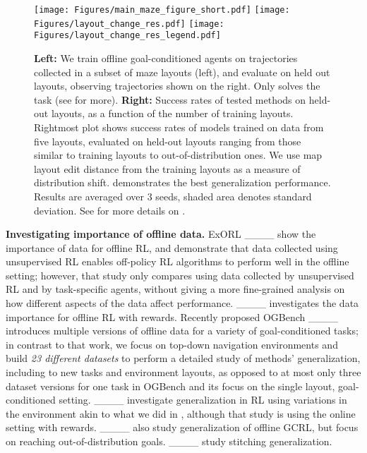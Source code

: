 \begin{figure}[t]
    \centering
    \texttt{[image: Figures/main\_maze\_figure\_short.pdf]}
    \texttt{[image: Figures/layout\_change\_res.pdf]}
    \texttt{[image: Figures/layout\_change\_res\_legend.pdf]}
    \caption{\textbf{Left:} We train offline goal-conditioned agents on trajectories collected in a subset of maze layouts (left), and evaluate on held out layouts, observing trajectories shown on the right. Only \JEPA{} solves the task (see  for more). \textbf{Right:} Success rates of tested methods on held-out layouts, as a function of the number of training layouts. Rightmost plot shows success rates of models trained on data from five layouts,
    evaluated on held-out layouts ranging from those similar to training layouts to out-of-distribution ones. We use map layout edit distance from the training layouts as a measure of distribution shift. \JEPA{} demonstrates the best generalization performance. Results are averaged over 3 seeds, shaded area denotes standard deviation. See  for more details on \JEPA{}.}
    \label{fig:maze_main_figure}
\end{figure}

\pagebreak

\textbf{Investigating importance of offline data.} ExORL ____ show the importance of data for offline RL, and demonstrate that data collected using unsupervised RL enables off-policy RL algorithms to perform well in the offline setting; however, that study only compares using data collected by unsupervised RL and by task-specific agents, without giving a more fine-grained analysis on how different aspects of the data affect performance. ____ investigates the data importance for offline RL with rewards.
Recently proposed OGBench ____ introduces multiple versions of offline data for a variety of goal-conditioned tasks; in contrast to that work, we focus on top-down 
navigation environments and build \textit{23 different datasets} to perform a detailed study of methods' generalization, including to new tasks and environment layouts, as opposed to at most only three dataset versions for one task in OGBench and its focus on the single layout, goal-conditioned setting. ____ investigate generalization in RL using variations in the environment akin to what we did in , although that study is using the online setting with rewards. ____ also study generalization of offline GCRL, but focus on reaching out-of-distribution goals. ____ study stitching generalization.